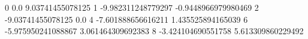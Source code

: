 0 0.0 9.03741455078125
1 -9.982311248779297 -0.9448966979980469
2 -9.03741455078125 0.0
4 -7.601888656616211 1.435525894165039
6 -5.975950241088867 3.061464309692383
8 -3.424104690551758 5.613309860229492
